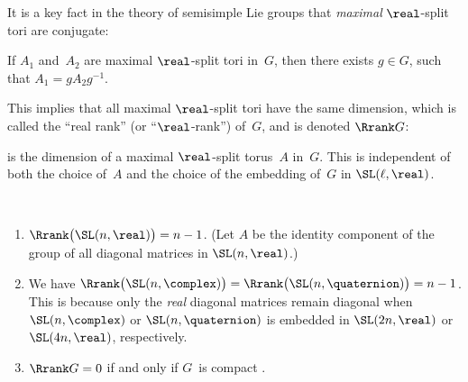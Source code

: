 %

It is a key fact in the theory of semisimple Lie groups that \emph{maximal} $\real$-split tori are conjugate:

\begin{thm}
If $A_1$ and~$A_2$ are maximal\/ $\real$-split tori in~$G$, then there exists $g \in G$, such that $A_1 = g A_2 g^{-1}$.
\end{thm}

This implies that all maximal $\real$-split tori have the same dimension, which is called the ``{real rank}'' (or ``$\real$-rank'') of~$G$, and is denoted $\Rrank G$:

 \begin{defn} \label{RrankDefn} %
 is the dimension of a maximal $\real$-split torus~$A$ in~$G$. 
This is independent of both the choice of~$A$ and the choice of the embedding of~$G$ in $\SL(\ell,\real)$.
 \end{defn}

 
\begin{egs} \ \label{RrankEgs}
 \noprelistbreak
 \begin{enumerate}

 \item $\Rrank \bigl( \SL(n,\real) \bigr) = n-1$. (Let $A$
be the identity component of the group of all diagonal
matrices in $\SL(n,\real)$.) 

 \item We have
 $\Rrank \bigl( \SL(n,\complex) \bigr) = \Rrank \bigl(
\SL(n,\quaternion) \bigr) = n-1$. This is because only the
\emph{real} diagonal matrices remain
diagonal when $\SL(n,\complex)$ or $\SL(n,\quaternion)$ is embedded in
$\SL(2n,\real)$ or $\SL(4n,\real)$, respectively.

\item \label{RrankEgs-cpct}
$\Rrank G = 0$ if and only if $G$~is compact .
 \end{enumerate}
 \end{egs}

